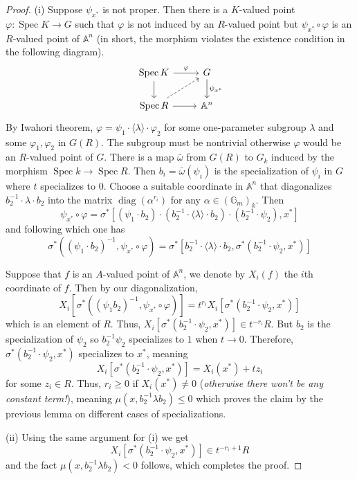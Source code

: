 \documentclass[12pt]{article}
\theoremstyle{remark}
\theoremstyle{definition}
\newcommand{\w}[0]{\omega}
\newcommand{\s}[0]{\sigma}
\newcommand{\A}[0]{\mathbb{A}}
\newcommand{\G}[0]{\mathbb{G}}
\newcommand{\Spec}[0]{\operatorname{Spec}}
\begin{document}
\begin{proof}
        (i) Suppose $\psi_{x^*}$ is not proper. Then there is a $K$-valued point $\varphi:\Spec K\to G$ such that $\varphi$ is not induced by an $R$-valued point but $\psi_{x^*}\circ\varphi$ is an $R$-valued point of $\A^n$ (in short, the morphism violates the existence condition in the following diagram).
        \[
            \begin{tikzcd}
                \Spec K \arrow[d] \arrow[r, "\varphi"] & G \arrow[d, "\psi_{x^*}"] \\
                \Spec R \arrow[r] \arrow[ru, dashed]   & \A^n                     
            \end{tikzcd}    
        \]
        By Iwahori theorem, $\varphi=\psi_1\cdot\langle\lambda\rangle\cdot\varphi_2$ for some one-parameter subgroup $\lambda$ and some $\varphi_1,\varphi_2$ in $G(R)$. The subgroup must be nontrivial otherwise $\varphi$ would be an $R$-valued point of $G$. There is a map $\bar\w$ from $G(R)$ to $G_k$ induced by the morphism $\Spec k\to \Spec R$. Then $b_i=\bar\w(\psi_i)$ is the specialization of $\psi_i$ in $G$ where $t$ specializes to $0$. Choose a suitable coordinate in $\A^n$ that diagonalizes $b_2^{-1}\cdot\lambda\cdot b_2$ into the matrix $\operatorname{diag}(\alpha^{r_i})$ for any $\alpha\in(\G_m)_k$. Then
        \[\psi_{x^*}\circ\varphi=\s^*\left[(\psi_1\cdot b_2)\cdot(b_2^{-1}\cdot\langle\lambda\rangle\cdot b_2)\cdot(b_2^{-1}\cdot\psi_2),x^*\right]\]
        and following which one has
        \[\s^*\left((\psi_1\cdot b_2)^{-1},\psi_{x^*}\circ\varphi\right)=\s^*\left[b_2^{-1}\cdot\langle\lambda\rangle\cdot b_2,\s^*(b_2^{-1}\cdot\psi_2,x^*)\right]\]

        Suppose that $f$ is an $A$-valued point of $\A^n$, we denote by $X_i(f)$ the $i$th coordinate of $f$. Then by our diagonalization,
        \[X_i\left[\s^*\left((\psi_1b_2)^{-1},\psi_{x^*}\circ\varphi\right)\right]=t^{r_i}X_i\left[\s^*(b_2^{-1}\cdot\psi_2,x^*)\right]\]
        which is an element of $R$. Thus, $X_i\left[\s^*(b_2^{-1}\cdot\psi_2,x^*)\right]\in t^{-r_i}R$. But $b_2$ is the specialization of $\psi_2$ so $b_2^{-1}\psi_2$ specializes to $1$ when $t\to 0$. Therefore, $\s^*(b_2^{-1}\cdot\psi_2,x^*)$ specializes to $x^*$, meaning
        \[X_i\left[\s^*(b_2^{-1}\cdot\psi_2,x^*)\right]=X_i(x^*)+tz_i\]
        for some $z_i\in R$. Thus, $r_i\geqslant 0$ if $X_i(x^*)\neq 0$ (\textit{otherwise there won't be any constant term!}), meaning $\mu(x,b_2^{-1}\lambda b_2)\leqslant 0$ which proves the claim by the previous lemma on different cases of specializations.

        (ii) Using the same argument for (i) we get
        \[X_i\left[\s^*(b_2^{-1}\cdot\psi_2,x^*)\right]\in t^{-r_i+1}R\]
        and the fact $\mu(x,b_2^{-1}\lambda b_2)< 0$ follows, which completes the proof.
    \end{proof}
\end{document}
